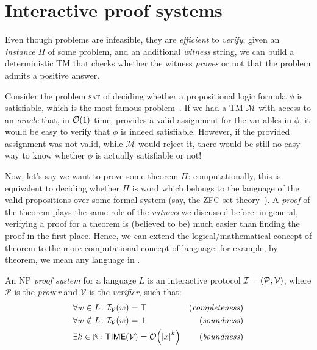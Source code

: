 \section{Interactive proof systems}\label{sec:interactive_proof_systems}
Even though \NPcomplete{} problems are infeasible, they are \emph{efficient} to \emph{verify}: 
given an \emph{instance} \(\Pi \) of some \NPcomplete{} problem, and an additional \emph{witness}
string, we can build a deterministic TM that checks whether the witness \emph{proves} or 
not that the problem admits a positive answer.
\begin{example}
  Consider the problem \textsc{sat} of deciding whether a propositional logic formula \(\phi \) is 
  satisfiable, which is the most famous \NPcomplete{} problem~\cite{Cook1971}. 
  If we had a TM \(\mathcal{M}\) with access to an \emph{oracle} that, in \(\BigO{1}\) time, 
  provides a valid assignment for the variables in \(\phi \), it would be easy to 
  verify that \(\phi \) is indeed satisfiable.
  However, if the provided assignment was not valid, while \(\mathcal{M}\) would reject it, 
  there would be still no easy way to know whether \(\phi \) is actually satisfiable or not! 
\end{example}

Now, let's say we want to prove some theorem \(\Pi \): computationally, this is equivalent to 
deciding whether \(\Pi \) is word which belongs to the language of the valid propositions over some 
formal system (say, the ZFC set theory~\cite{FraenkelHL1973}).
A \emph{proof} of the theorem plays the same role of the \emph{witness} we discussed before: in 
general, verifying a proof for a theorem is (believed to be) much easier than finding the proof in 
the first place.
Hence, we can extend the logical/mathematical concept of theorem to the more computational concept 
of language: for example, by \NPtime{} theorem, we mean any language in \NPtime{}.

\clearpage
\begin{definition}  
  An \textsc{NP} \emph{proof system} for a language \(L\) is an interactive protocol 
  \(\mathcal{I} = \left(\mathcal{P}, \mathcal{V}\right)\), where \(\mathcal{P}\) is the \emph{prover}
  and \(\mathcal{V}\) is the \emph{verifier}, such that:
  \begin{align*}
    & \forall w \in L\colon \call{\mathcal{I}_{\mathcal{V}}}{w} = \top & 
      \textnormal{(\emph{completeness})} \\
    & \forall w \notin L\colon \call{\mathcal{I}_{\mathcal{V}}}{w} = \bot & 
      \textnormal{(\emph{soundness})} \\
    & \exists k \in \mathbb{N}\colon \call{\Time}{\mathcal{V}} = \BigO{\abs{x}^k} & 
    \textnormal{(\emph{boundness})}
  \end{align*}
\end{definition}

